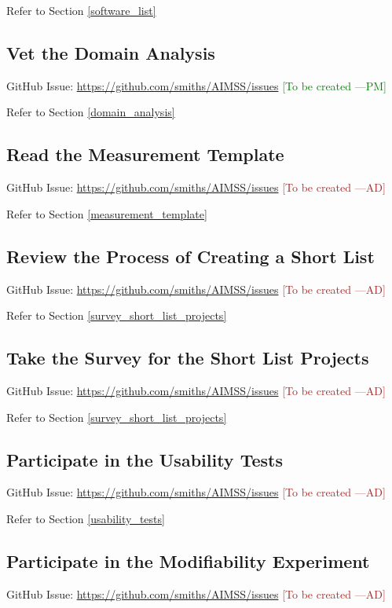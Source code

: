 \documentclass[12pt]{article}
\newcommand{\authornote}[3]{\textcolor{#1}{[#3 ---#2]}}
\newcommand{\authornote}[3]{}
\newcommand{\pmi}[1]{\authornote{green}{PM}{#1}} %
\newcommand{\ad}[1]{\authornote{brown}{AD}{#1}} %
\begin{document}
\noindent Refer to Section \ref{software_list}

\subsection{Vet the Domain Analysis}
\label{task_domain_analysis}
GitHub Issue:
\href{https://github.com/smiths/AIMSS/issues}{https://github.com/smiths/AIMSS/issues}
\pmi{To be created}

\noindent Refer to Section \ref{domain_analysis}

\subsection{Read the Measurement Template}
\label{task_measurement_template}
GitHub Issue:
\href{https://github.com/smiths/AIMSS/issues}{https://github.com/smiths/AIMSS/issues}
\ad{To be created}

\noindent Refer to Section \ref{measurement_template}

\subsection{Review the Process of Creating a Short List}
\label{task_review_short_list}
GitHub Issue:
\href{https://github.com/smiths/AIMSS/issues}{https://github.com/smiths/AIMSS/issues}
\ad{To be created}

\noindent Refer to Section \ref{survey_short_list_projects}

\subsection{Take the Survey for the Short List Projects}
\label{task_short_list_survey}
GitHub Issue:
\href{https://github.com/smiths/AIMSS/issues}{https://github.com/smiths/AIMSS/issues}
\ad{To be created}

\noindent Refer to Section \ref{survey_short_list_projects}

\subsection{Participate in the Usability Tests}
\label{task_usability_tests}
GitHub Issue:
\href{https://github.com/smiths/AIMSS/issues}{https://github.com/smiths/AIMSS/issues}
\ad{To be created}

\noindent Refer to Section \ref{usability_tests}

\subsection{Participate in the Modifiability Experiment}
\label{task_modifiability_experiment}
GitHub Issue:
\href{https://github.com/smiths/AIMSS/issues}{https://github.com/smiths/AIMSS/issues}
\ad{To be created}
\end{document}

